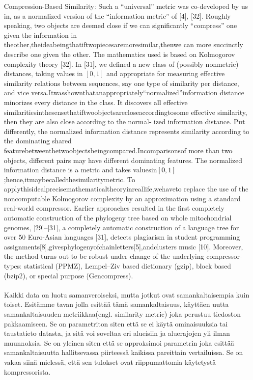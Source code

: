 \documentclass[11pt,finnish]{tktltiki2}
\theoremstyle{definition}
\theoremstyle{remark}
\begin{document}
  Compression-Based Similarity: Such a “universal” metric was co-developed by us in, as a normalized version of the “information metric” of [4], [32]. Roughly speaking, two objects are deemed close if we can significantly “compress” one given the information in theother,theideabeingthatiftwopiecesaremoresimilar,thenwe can more succinctly describe one given the other. The mathematics used is based on Kolmogorov complexity theory [32]. In [31], we defined a new class of (possibly nonmetric) distances, taking values in $[0,1]$ and appropriate for measuring effective similarity relations between sequences, say one type of similarity per distance, and vice versa.Itwasshownthatanappropriately“normalized”information distance minorizes every distance in the class. It discovers all effective similaritiesinthesensethatiftwoobjectsarecloseaccordingtosome effective similarity, then they are also close according to the normal- ized information distance. Put differently, the normalized information distance represents similarity according to the dominating shared featurebetweenthetwoobjectsbeingcompared.Incomparisonsof more than two objects, different pairs may have different dominating features. The normalized information distance is a metric and takes valuesin$[0,1]$;hence,itmaybecalledthesimilaritymetric.
  To applythisidealprecisemathematicaltheoryinreallife,wehaveto replace the use of the noncomputable Kolmogorov complexity by an approximation using a standard real-world compressor. Earlier approaches resulted in the first completely automatic construction of the phylogeny tree based on whole mitochondrial genomes, [29]–[31], a completely automatic construction of a language tree for over 50 Euro-Asian languages [31], detects plagiarism in student programming assignments[8],givesphylogenyofchainletters[5],andclusters music [10]. Moreover, the method turns out to be robust under change of the underlying compressor-types: statistical (PPMZ), Lempel–Ziv based dictionary (gzip), block based (bzip2), or special purpose (Gencompress).
\fi
\paragraph{} %
\label{par:intro-1}
  Kaikki data on luotu samanveroiseksi, mutta jotkut ovat samankaltaisempia kuin toiset. Esitämme tavan jolla esittää tämä samankaltaisuus, käyttäen uutta samankaltaisuuden metriikkaa(engl. similarity metric) joka perustuu tiedoston pakkaamiseen. Se on parametriton siten että se ei käytä ominaisuuksia tai taustatieto datasta, ja sitä voi soveltaa eri alueisiin ja aluerajojen yli ilman muunnoksia. Se on yleinen siten että se approksimoi parametrin joka esittää samankaltaisuutta hallitsevassa piirteessä kaikissa pareittain vertailuissa. Se on vakaa siinä mielessä, että sen tulokset ovat riippumattomia käytetystä kompressorista.
\end{document}

